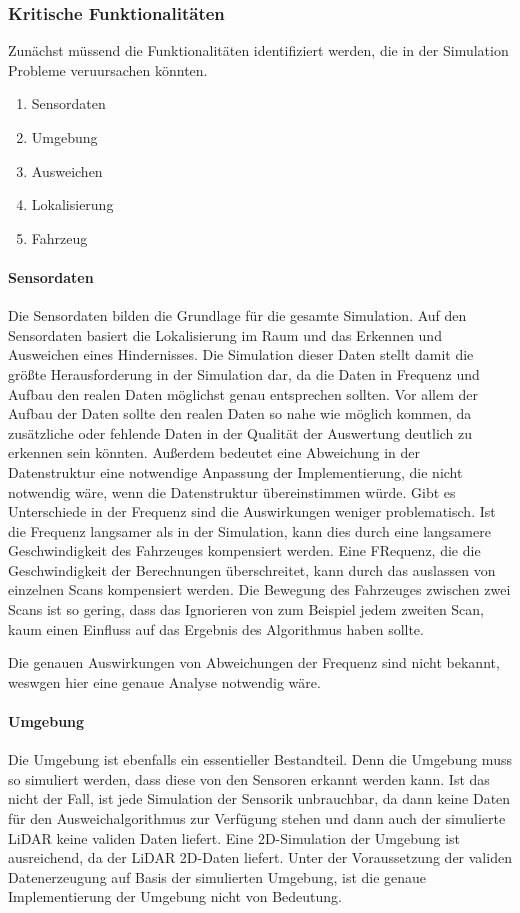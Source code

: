 \subsubsection{Kritische Funktionalitäten}
Zunächst müssend die Funktionalitäten identifiziert werden, die in der Simulation Probleme veruursachen könnten.
\begin{enumerate}
    \item Sensordaten
    \item Umgebung 
    \item Ausweichen
    \item Lokalisierung
    \item Fahrzeug
\end{enumerate}

\paragraph{Sensordaten}
Die Sensordaten bilden die Grundlage für die gesamte Simulation. 
Auf den Sensordaten basiert die Lokalisierung im Raum und das Erkennen und Ausweichen eines Hindernisses. 
Die Simulation dieser Daten stellt damit die größte Herausforderung in der Simulation dar, 
da die Daten in Frequenz und Aufbau den realen Daten möglichst genau entsprechen sollten.
Vor allem der Aufbau der Daten sollte den realen Daten so nahe wie möglich kommen, 
da zusätzliche oder fehlende Daten in der Qualität der Auswertung deutlich zu erkennen sein könnten. 
Außerdem bedeutet eine Abweichung in der Datenstruktur eine notwendige Anpassung der Implementierung, 
die nicht notwendig wäre, wenn die Datenstruktur übereinstimmen würde.
Gibt es Unterschiede in der Frequenz sind die Auswirkungen weniger problematisch. 
Ist die Frequenz langsamer als in der Simulation, kann dies durch eine langsamere Geschwindigkeit des Fahrzeuges kompensiert werden.
Eine FRequenz, die die Geschwindigkeit der Berechnungen überschreitet, kann durch das auslassen von einzelnen Scans kompensiert werden.
Die Bewegung des Fahrzeuges zwischen zwei Scans ist so gering, dass das Ignorieren von zum Beispiel jedem zweiten Scan,
kaum einen Einfluss auf das Ergebnis des Algorithmus haben sollte. 

Die genauen Auswirkungen von Abweichungen der Frequenz sind nicht bekannt, weswgen hier eine genaue Analyse notwendig wäre.

\paragraph{Umgebung}
Die Umgebung ist ebenfalls ein essentieller Bestandteil. 
Denn die Umgebung muss so simuliert werden, dass diese von den Sensoren erkannt werden kann. 
Ist das nicht der Fall, ist jede Simulation der Sensorik unbrauchbar, 
da dann keine Daten für den Ausweichalgorithmus zur Verfügung stehen und dann auch der simulierte LiDAR keine validen Daten liefert.
Eine 2D-Simulation der Umgebung ist ausreichend, da der LiDAR 2D-Daten liefert.
Unter der Voraussetzung der validen Datenerzeugung auf Basis der simulierten Umgebung, 
ist die genaue Implementierung der Umgebung nicht von Bedeutung. 

